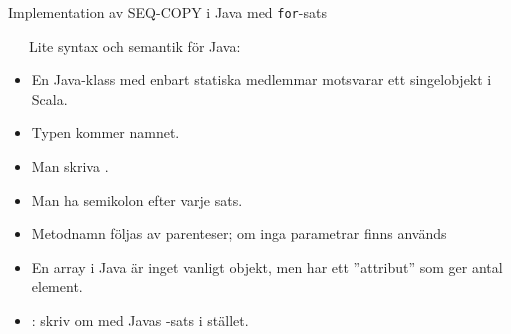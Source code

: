\begin{Slide}{Implementation av SEQ-COPY i Java med \texttt{for}-sats}
\begin{minipage}{0.55\textwidth}
\vspace{-0.5em}
\end{minipage}
\begin{minipage}{0.44\textwidth}\SlideFontTiny\vspace{-1.5em}\ifkompendium\small\fi
~~~Lite syntax och semantik för Java:
\begin{itemize}
\item En Java-klass med enbart statiska medlemmar motsvarar ett singelobjekt i Scala.

\item Typen kommer  namnet.

\item Man  skriva .

\item Man  ha semikolon efter varje sats.

\item Metodnamn  följas av parenteser; om inga parametrar finns används \code{()}

\item En array i Java är inget vanligt objekt, men har ett ''attribut''  som ger antal element.

\item {}: skriv om med Javas -sats i stället.

\end{itemize}
\end{minipage}

\end{Slide}
  


